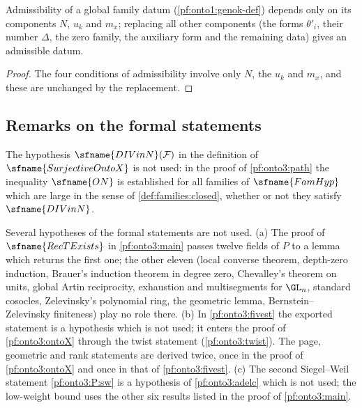 \begin{lemma}\label{pf:onto3:refill}
Admissibility of a global family datum (\cref{pf:onto1:genok-def}) depends only on its components $N$, $u_k$ and $m_x$;
replacing all other components (the forms $\theta'_i$, their number $\Delta$, the zero family, the auxiliary form and
the remaining data) gives an admissible datum.
\end{lemma}

\begin{proof}
The four conditions of admissibility involve only $N$, the $u_k$ and $m_x$, and these are unchanged by the
replacement.
\end{proof}

\subsection{Remarks on the formal statements}\label{sec:pf:onto3:remarks}

\begin{remark}\label{pf:onto3:rem:divinn}
The hypothesis $\sfname{DIVinN}(\mathcal F)$ in the definition of $\sfname{SurjectiveOntoX}$ is not used: in the
proof of \cref{pf:onto3:path} the inequality $\sfname{ON}$ is established for all families of $\sfname{FamHyp}$ which
are large in the sense of \cref{def:families:closed}, whether or not they satisfy $\sfname{DIVinN}$.
\end{remark}

\begin{remark}\label{pf:onto3:rem:unused}
Several hypotheses of the formal statements are not used. (a) The proof of $\sfname{RecTExists}$ in
\cref{pf:onto3:main} passes twelve fields of $P$ to a lemma which returns the first one; the other eleven (local
converse theorem, depth-zero induction, Brauer's induction theorem in degree zero, Chevalley's theorem on units,
global Artin reciprocity, exhaustion and multisegments for $\GL_n$, standard cosocles, Zelevinsky's polynomial ring,
the geometric lemma, Bernstein--Zelevinsky finiteness) play no role there. (b) In \cref{pf:onto3:fivest} the exported statement is a
hypothesis which is not used; it enters the proof of \cref{pf:onto3:ontoX} through the twist statement
(\cref{pf:onto3:twist}). The page, geometric and rank statements are derived twice, once in the proof of
\cref{pf:onto3:ontoX} and once in that of \cref{pf:onto3:fivest}. (c) The second Siegel--Weil statement
\ref{pf:onto3:P:sw} is a hypothesis of \cref{pf:onto3:adelc} which is not used; the low-weight bound uses the other
six results listed in the proof of \cref{pf:onto3:main}.
\end{remark}

